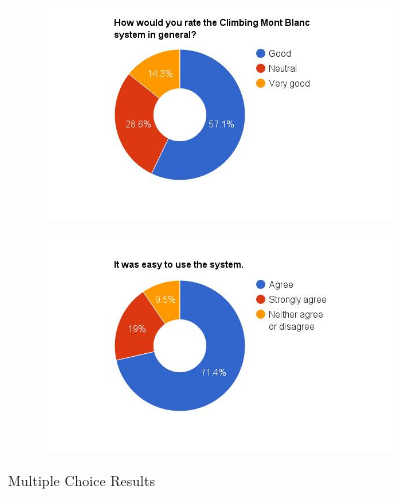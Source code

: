 \begin{figure}
    \hspace*{-1.5cm}
    \begin{subfigure}[h]{0.5\textwidth}
        \includegraphics[width=1.5\textwidth, height=1.0\textwidth]{results/general_cmb.jpg}
        \caption{}
        \label{fig:cmb-general}
    \end{subfigure}
    \hfill
    \begin{subfigure}[h]{0.5\textwidth}
        \includegraphics[width=1.5\textwidth, height=1.0\textwidth]{results/easy_to_use.jpg}
        \caption{}
        \label{fig:cmb-easy-use}
    \end{subfigure}
    \caption{Multiple Choice Results}
    \label{fig:multiplechoice}
\end{figure}


